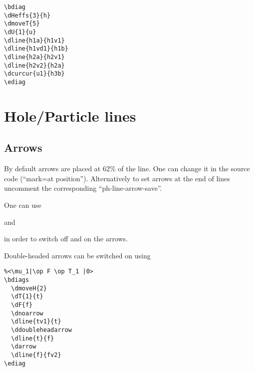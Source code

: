\documentclass[a4paper]{article}
\newcommand{\myind}{\hspace{10pt}}
\begin{document}
 \begin{minipage}[b]{0.55\linewidth}\centering
  \begin{lstlisting}
\bdiag
\dHeffs{3}{h}
\dmoveT{5}
\dU{1}{u}
\dline{h1a}{h1v1}
\dline{h1vd1}{h1b}
\dline{h2a}{h2v1}
\dline{h2v2}{h2a}
\dcurcur{u1}{h3b}
\ediag
  \end{lstlisting}
 \end{minipage}
 \begin{minipage}[b]{0.45\linewidth}\centering
\bdiag
{}
\ediag
 \end{minipage}

\section{Hole/Particle lines}

\subsection{Arrows}

By default arrows are placed at 62\% of the line. One can change it in the source code 
(``mark=at position'').
Alternatively to set arrows at the end of lines uncomment the corresponding ``ph-line-arrow-save''.

One can use 

\myind{\bf \textbackslash dnoarrow}

and

\myind{\bf \textbackslash darrow}

in order to switch off and on the arrows.

Double-headed arrows can be switched on using 

\myind{\bf \textbackslash ddoubleheadarrow}

 \begin{minipage}[b]{0.55\linewidth}\centering
  \begin{lstlisting}
%<\mu_1|\op F \op T_1 |0>
\bdiags
  \dmoveH{2}
  \dT{1}{t}
  \dF{f}
  \dnoarrow
  \dline{tv1}{t}
  \ddoubleheadarrow
  \dline{t}{f}
  \darrow
  \dline{f}{fv2}
\ediag 
  \end{lstlisting}
 \end{minipage}
 \begin{minipage}[b]{0.45\linewidth}\centering
    \bdiags
    \dnoarrow
    \ddoubleheadarrow
    \darrow
    \ediag
 \end{minipage}
\end{document}
